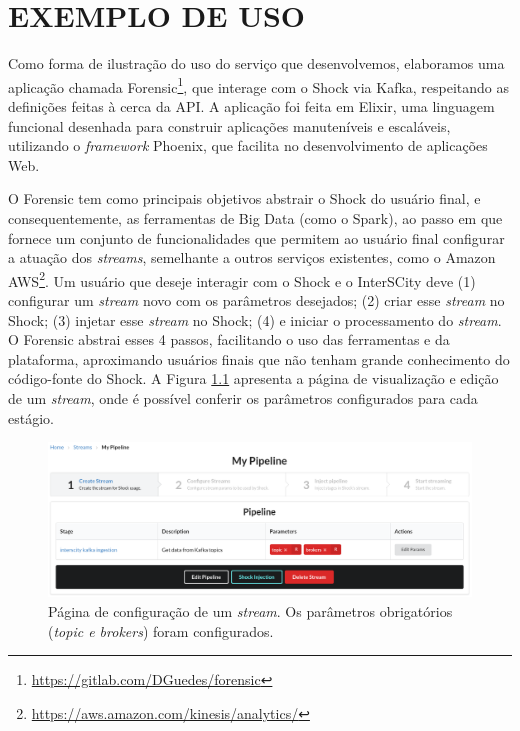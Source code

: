 \chapter[EXEMPLO DE USO]{EXEMPLO DE USO}
\label{chapter:example}

Como forma de ilustração do uso do serviço que desenvolvemos, elaboramos uma
aplicação chamada
Forensic\footnote{\url{https://gitlab.com/DGuedes/forensic}}, que interage
com o Shock via Kafka,
respeitando as definições feitas à cerca da API. A aplicação foi feita em
Elixir, uma linguagem funcional desenhada para construir aplicações
manuteníveis e escaláveis, utilizando o \textit{framework} Phoenix, que
facilita no desenvolvimento de aplicações Web.

O Forensic tem como principais objetivos abstrair o Shock do usuário final,
e consequentemente, as ferramentas de Big Data (como o Spark), ao passo em que
fornece um conjunto de funcionalidades que permitem ao usuário final configurar
a atuação dos \textit{streams}, semelhante a outros serviços existentes,
como o Amazon AWS\footnote{\url{https://aws.amazon.com/kinesis/analytics/}}.
Um usuário que deseje interagir com o Shock e o InterSCity deve
(1) configurar um \textit{stream} novo com os
parâmetros desejados; (2) criar esse \textit{stream} no Shock; (3) injetar
esse \textit{stream} no Shock; (4) e iniciar o processamento do
\textit{stream}. O Forensic abstrai esses 4 passos, facilitando o uso
das ferramentas e da plataforma, aproximando usuários finais que não tenham
grande conhecimento do código-fonte do Shock. A Figura \ref{fig:forensicparams} apresenta
a página de visualização e edição de um \textit{stream}, onde é possível
conferir os parâmetros configurados para cada estágio.

\begin{figure}[H]
  \centering
  \includegraphics[width=\textwidth]{figuras/pipeline.png}
    \caption{Página de configuração de um \textit{stream}. Os parâmetros
obrigatórios (\textit{topic e brokers}) foram configurados.}
  \label{fig:forensicparams}
\end{figure}


